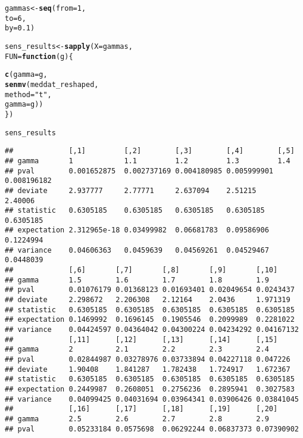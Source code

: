 \documentclass[11pt,leqno]{article}\usepackage[]{graphicx}\usepackage[]{color}
\makeatletter
\newcommand{\hlnum}[1]{\textcolor[rgb]{0.686,0.059,0.569}{#1}}%
\newcommand{\hlstr}[1]{\textcolor[rgb]{0.192,0.494,0.8}{#1}}%
\newcommand{\hlstd}[1]{\textcolor[rgb]{0.345,0.345,0.345}{#1}}%
\newcommand{\hlkwa}[1]{\textcolor[rgb]{0.161,0.373,0.58}{\textbf{#1}}}%
\newcommand{\hlkwb}[1]{\textcolor[rgb]{0.69,0.353,0.396}{#1}}%
\newcommand{\hlkwc}[1]{\textcolor[rgb]{0.333,0.667,0.333}{#1}}%
\newcommand{\hlkwd}[1]{\textcolor[rgb]{0.737,0.353,0.396}{\textbf{#1}}}%
\newenvironment{kframe}{%
 \def\at@end@of@kframe{}%
 \ifinner\ifhmode%
  \def\at@end@of@kframe{\end{minipage}}%
  \begin{minipage}{\columnwidth}%
 \fi\fi%
 \def\FrameCommand##1{\hskip\@totalleftmargin \hskip-\fboxsep
 \colorbox{shadecolor}{##1}\hskip-\fboxsep
     \hskip-\linewidth \hskip-\@totalleftmargin \hskip\columnwidth}%
 \MakeFramed {\advance\hsize-\width
   \@totalleftmargin\z@ \linewidth\hsize
   \@setminipage}}%
 {\par\unskip\endMakeFramed%
 \at@end@of@kframe}
\newenvironment{knitrout}{}{} %
\theoremstyle{newstyle}
\makeatother
\begin{document}
\begin{knitrout}
\begin{kframe}
\begin{alltt}
\hlstd{gammas} \hlkwb{<-} \hlkwd{seq}\hlstd{(}\hlkwc{from} \hlstd{=} \hlnum{1}\hlstd{,}
              \hlkwc{to} \hlstd{=} \hlnum{6}\hlstd{,}
              \hlkwc{by} \hlstd{=} \hlnum{0.1}\hlstd{)}

\hlstd{sens_results} \hlkwb{<-} \hlkwd{sapply}\hlstd{(}\hlkwc{X} \hlstd{= gammas,}
                       \hlkwc{FUN} \hlstd{=} \hlkwa{function}\hlstd{(}\hlkwc{g}\hlstd{) \{}

                         \hlkwd{c}\hlstd{(}\hlkwc{gamma} \hlstd{= g,}
                           \hlkwd{senmv}\hlstd{(meddat_reshaped,}
                                 \hlkwc{method} \hlstd{=} \hlstr{"t"}\hlstd{,}
                                 \hlkwc{gamma} \hlstd{= g))}
                         \hlstd{\})}

\hlstd{sens_results}
\end{alltt}
\begin{verbatim}
##             [,1]         [,2]        [,3]        [,4]        [,5]       
## gamma       1            1.1         1.2         1.3         1.4        
## pval        0.001652875  0.002737169 0.004180985 0.005999901 0.008196182
## deviate     2.937777     2.77771     2.637094    2.51215     2.40006    
## statistic   0.6305185    0.6305185   0.6305185   0.6305185   0.6305185  
## expectation 2.312965e-18 0.03499982  0.06681783  0.09586906  0.1224994  
## variance    0.04606363   0.0459639   0.04569261  0.04529467  0.0448039  
##             [,6]       [,7]       [,8]       [,9]       [,10]     
## gamma       1.5        1.6        1.7        1.8        1.9       
## pval        0.01076179 0.01368123 0.01693401 0.02049654 0.0243437 
## deviate     2.298672   2.206308   2.12164    2.0436     1.971319  
## statistic   0.6305185  0.6305185  0.6305185  0.6305185  0.6305185 
## expectation 0.1469992  0.1696145  0.1905546  0.2099989  0.2281022 
## variance    0.04424597 0.04364042 0.04300224 0.04234292 0.04167132
##             [,11]      [,12]      [,13]      [,14]      [,15]     
## gamma       2          2.1        2.2        2.3        2.4       
## pval        0.02844987 0.03278976 0.03733894 0.04227118 0.047226  
## deviate     1.90408    1.841287   1.782438   1.724917   1.672367  
## statistic   0.6305185  0.6305185  0.6305185  0.6305185  0.6305185 
## expectation 0.2449987  0.2608051  0.2756236  0.2895941  0.3027583 
## variance    0.04099425 0.04031694 0.03964341 0.03906426 0.03841045
##             [,16]      [,17]      [,18]      [,19]      [,20]     
## gamma       2.5        2.6        2.7        2.8        2.9       
## pval        0.05233184 0.0575698  0.06292244 0.06837373 0.07390902

\end{verbatim}
\end{kframe}
\end{knitrout}
\end{document}
